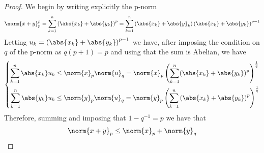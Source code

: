 \documentclass[../mmf.tex]{subfiles}
\begin{document}
\begin{proof}
	We begin by writing explicitly the p-norm
	\begin{equation*}
		\norm{x+y}_p^p=\sum_{k=1}^n\left( \abs{x_k}+\abs{y_k} \right)^p=\sum_{k=1}^n\left( \abs{x_k}+\abs{y}_k \right)\left( \abs{x_k}+\abs{y_k} \right)^{p-1}
	\end{equation*}
	Letting $u_k=\left( \abs{x_k}+\abs{y_k} \right)^{p-1}$ we have, after imposing the condition on $q$ of the p-norm as $q(p+1)=p$ and using that the sum is Abelian, we have
	\begin{equation*}
		\left\{\begin{aligned}
				\sum_{k=1}^n\abs{x_k}u_k&\le\norm{x}_p\norm{u}_q=\norm{x}_p\left(\sum_{k=1}^n(\abs{x_k}+\abs{y_k})^p\right)^{\frac{1}{q}}\\
				\sum_{k=1}^n\abs{y_k}u_k&\le\norm{y}_p\norm{u}_q=\norm{y}_p\left( \sum_{k=1}^n\left( \abs{x_k}+\abs{y_k} \right)^p \right)^{\frac{1}{q}}
		\end{aligned}\right.
	\end{equation*}
	Therefore, summing and imposing that $1-q^{-1}=p$ we have that
	\begin{equation*}
		\norm{x+y}_p\le\norm{x}_p+\norm{y}_q
	\end{equation*}
\end{proof}
\end{document}
